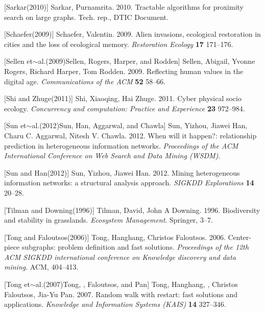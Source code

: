 \documentclass{article} %
\begin{document}
\noindent 

[Sarkar(2010)]  Sarkar, Purnamrita. 2010.    Tractable algorithms for proximity search on large graphs.    Tech. rep., DTIC Document.

\noindent 

 [Schaefer(2009)]  Schaefer, Valentin. 2009.    Alien invasions, ecological restoration in cities and the loss of ecological memory.    \textit{ Restoration Ecology} \textbf{ 17} 171--176.

\noindent 

[Sellen et$\sim$al.(2009)Sellen, Rogers, Harper, and Rodden]  Sellen, Abigail, Yvonne Rogers, Richard Harper, Tom Rodden. 2009.    Reflecting human values in the digital age.    \textit{ Communications of the ACM} \textbf{ 52} 58--66.

\noindent 

[Shi and Zhuge(2011)]  Shi, Xiaoqing, Hai Zhuge. 2011.    Cyber physical socio ecology.    \textit{ Concurrency and computation: Practice and Experience} \textbf{ 23} 972--984.

\noindent 

[Sun et$\sim$al.(2012)Sun, Han, Aggarwal, and Chawla]  Sun, Yizhou, Jiawei Han, Charu C. Aggarwal, Nitesh V. Chawla. 2012.    When will it happen?: relationship prediction in heterogeneous information networks.    \textit{ Proceedings of the ACM International Conference on Web Search and Data Mining (WSDM)}.

\noindent 

[Sun and Han(2012)]  Sun, Yizhou, Jiawei Han. 2012.    Mining heterogeneous information networks: a structural analysis approach.    \textit{ SIGKDD Explorations} \textbf{ 14} 20--28.

\noindent 

[Tilman and Downing(1996)]  Tilman, David, John A Downing. 1996.    Biodiversity and stability in grasslands.    \textit{ Ecosystem Management}. Springer, 3--7.

\noindent 

[Tong and Faloutsos(2006)]  Tong, Hanghang, Christos Faloutsos. 2006.    Center-piece subgraphs: problem definition and fast solutions.    \textit{ Proceedings of the 12th ACM SIGKDD international conference on Knowledge discovery and data mining}. ACM, 404--413.

\noindent 

[Tong et$\sim$al.(2007)Tong, , Faloutsos, and Pan]  Tong, Hanghang, , Christos Faloutsos, Jia-Yu Pan. 2007.    Random walk with restart: fast solutions and applications.    \textit{ Knowledge and Information Systems (KAIS)} \textbf{ 14} 327--346.
\end{document}
